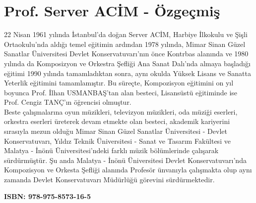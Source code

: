 


\begin{figure}[!hbt]
\centering
{}
\end{figure}


\section*{Prof. Server ACİM - Özgeçmiş}
22 Nisan 1961 yılında İstanbul’da doğan Server ACİM, Harbiye İlkokulu ve Şişli Ortaokulu’nda aldığı temel eğitimin ardından 1978 yılında, Mimar Sinan Güzel Sanatlar Üniversitesi Devlet Konservatuvarı’nın önce Kontrbas alanında ve 1980 yılında da Komposizyon ve Orkestra Şefliği Ana Sanat Dalı’nda almaya başladığı eğitimi 1990 yılında tamamladıktan sonra, aynı okulda Yüksek Lisans ve Sanatta Yeterlik eğitimini tamamlamıştır. Bu süreçte, Kompozisyon eğitimini on yıl boyunca Prof. İlhan USMANBAŞ’tan alan besteci, Lisansüstü eğitiminde ise Prof. Cengiz TANÇ’ın öğrencisi olmuştur. \\ [.1in]
Beste çalışmalarına oyun müzikleri, televizyon müzikleri, oda müziği eserleri, orkestra eserleri  üreterek devam etmekte olan besteci, akademik kariyerini sırasıyla mezun olduğu Mimar Sinan Güzel Sanatlar Üniversitesi - Devlet Konservatuvarı, Yıldız Teknik Üniversitesi - Sanat ve Tasarım Fakültesi ve Malatya - İnönü Üniversitesi’ndeki farklı müzik bölümlerinde çalışarak sürdürmüştür. Şu anda Malatya - İnönü Üniversitesi Devlet Konservatuvarı’nda Kompozisyon ve Orkesta Şefliği alanında Profesör ünvanıyla çalışmakta olup aynı zamanda Devlet Konservatuvarı Müdürlüğü görevini sürdürmektedir.

\vfill
\begin{flushright}
\textbf{ISBN: 978-975-8573-16-5}
\end{flushright}